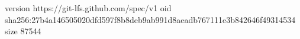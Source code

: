 version https://git-lfs.github.com/spec/v1
oid sha256:27b4a146505020dfd597f8b8deb9ab991d8aeadb767111e3b842646f49314534
size 87544
